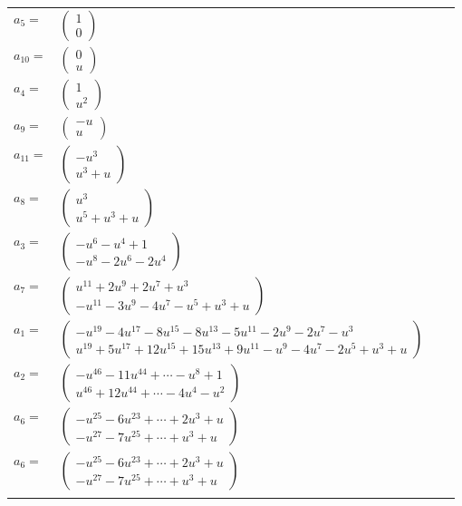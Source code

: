 \documentclass[1p]{elsarticle_modified}
\theoremstyle{definition}
\begin{document}
\begin{tabular}{m{7pt} m{180pt} m{7pt} m{180pt} }
\flushright $a_{5}=$&$\begin{pmatrix}1\\0\end{pmatrix}$ \\
\flushright $a_{10}=$&$\begin{pmatrix}0\\u\end{pmatrix}$ \\
\flushright $a_{4}=$&$\begin{pmatrix}1\\u^2\end{pmatrix}$ \\
\flushright $a_{9}=$&$\begin{pmatrix}- u\\u\end{pmatrix}$ \\
\flushright $a_{11}=$&$\begin{pmatrix}- u^3\\u^3+u\end{pmatrix}$ \\
\flushright $a_{8}=$&$\begin{pmatrix}u^3\\u^5+u^3+u\end{pmatrix}$ \\
\flushright $a_{3}=$&$\begin{pmatrix}- u^6- u^4+1\\- u^8-2 u^6-2 u^4\end{pmatrix}$ \\
\flushright $a_{7}=$&$\begin{pmatrix}u^{11}+2 u^9+2 u^7+u^3\\- u^{11}-3 u^9-4 u^7- u^5+u^3+u\end{pmatrix}$ \\
\flushright $a_{1}=$&$\begin{pmatrix}- u^{19}-4 u^{17}-8 u^{15}-8 u^{13}-5 u^{11}-2 u^9-2 u^7- u^3\\u^{19}+5 u^{17}+12 u^{15}+15 u^{13}+9 u^{11}- u^9-4 u^7-2 u^5+u^3+u\end{pmatrix}$ \\
\flushright $a_{2}=$&$\begin{pmatrix}- u^{46}-11 u^{44}+\cdots- u^8+1\\u^{46}+12 u^{44}+\cdots-4 u^4- u^2\end{pmatrix}$ \\
\flushright $a_{6}=$&$\begin{pmatrix}- u^{25}-6 u^{23}+\cdots+2 u^3+u\\- u^{27}-7 u^{25}+\cdots+u^3+u\end{pmatrix}$\\ \flushright $a_{6}=$&$\begin{pmatrix}- u^{25}-6 u^{23}+\cdots+2 u^3+u\\- u^{27}-7 u^{25}+\cdots+u^3+u\end{pmatrix}$\\&\end{tabular}
\end{document}
